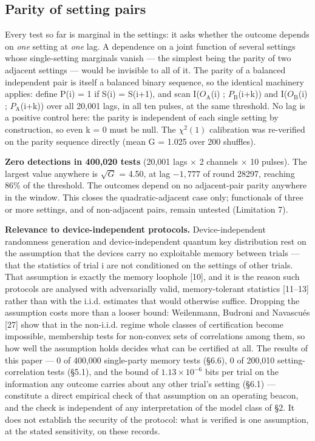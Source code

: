 \documentclass[
  11pt,
]{article}
\begin{document}
\subsection{Parity of setting pairs}

Every test so far is marginal in the settings: it asks whether the
outcome depends on \emph{one} setting at \emph{one} lag. A dependence on
a joint function of several settings whose single-setting marginals
vanish --- the simplest being the parity of two adjacent settings ---
would be invisible to all of it. The parity of a balanced independent
pair is itself a balanced binary sequence, so the identical machinery
applies: define P(i) = 1 if S(i) = S(i+1), and scan
I(\(O_{\mathrm{A}}\)(i) ; \(P_{\mathrm{B}}\)(i+k)) and
I(\(O_{\mathrm{B}}\)(i) ; \(P_{\mathrm{A}}\)(i+k)) over all 20,001 lags,
in all ten pulses, at the same threshold. No lag is a positive control
here: the parity is independent of each single setting by construction,
so even k = 0 must be null. The \(\chi^2(1)\) calibration was
re-verified on the parity sequence directly (mean G = 1.025 over 200
shuffles).

\textbf{Zero detections in 400,020 tests} (20,001 lags \(\times\) 2
channels \(\times\) 10 pulses). The largest value anywhere is
\(\sqrt{G}\) = 4.50, at lag \(-1,777\) of round 28297, reaching 86\% of
the threshold. The outcomes depend on no adjacent-pair parity anywhere
in the window. This closes the quadratic-adjacent case only; functionals
of three or more settings, and of non-adjacent pairs, remain untested
(Limitation 7).

\textbf{Relevance to device-independent protocols.} Device-independent
randomness generation and device-independent quantum key distribution
rest on the assumption that the devices carry no exploitable memory
between trials --- that the statistics of trial i are not conditioned on
the settings of other trials. That assumption is exactly the memory
loophole {[}10{]}, and it is the reason such protocols are analysed with
adversarially valid, memory-tolerant statistics {[}11--13{]} rather than
with the i.i.d. estimates that would otherwise suffice. Dropping the
assumption costs more than a looser bound: Weilenmann, Budroni and
Navascués {[}27{]} show that in the non-i.i.d. regime whole classes of
certification become impossible, membership tests for non-convex sets of
correlations among them, so how well the assumption holds decides what
can be certified at all. The results of this paper --- 0 of 400,000
single-party memory tests (\S6.6), 0 of 200,010 setting-correlation
tests (\S5.1), and the bound of \(1.13 \times 10^{-6}\) bits per trial
on the information any outcome carries about any other trial's setting
(\S6.1) --- constitute a direct empirical check of that assumption on an
operating beacon, and the check is independent of any interpretation of
the model class of \S2. It does not establish the security of the
protocol: what is verified is one assumption, at the stated sensitivity,
on these records.
\end{document}
